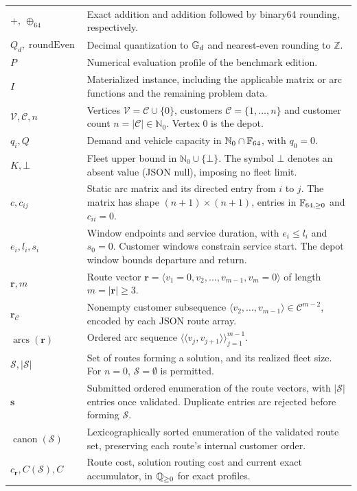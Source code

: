 \begin{longtable}{@{}>{\raggedright\arraybackslash}p{4cm}>{\raggedright\arraybackslash}p{12cm}@{}}
$+,\ \oplus_{64}$ & Exact addition and addition followed by binary64 rounding, respectively.\\
$Q_d,\operatorname{roundEven}$ & Decimal quantization to $\mathbb{G}_{d}$ and nearest-even rounding to $\mathbb{Z}$.\\
$P$ & Numerical evaluation profile of the benchmark edition.\\
$I$ & Materialized instance, including the applicable matrix or arc functions and the remaining problem data.\\
$\mathcal{V},\mathcal{C},n$ & Vertices $\mathcal{V}=\mathcal{C}\cup\{0\}$, customers $\mathcal{C}=\{1,\ldots,n\}$ and customer count $n=|\mathcal{C}|\in\mathbb{N}_0$. Vertex 0 is the depot.\\
$q_i,Q$ & Demand and vehicle capacity in $\mathbb{N}_0\cap\mathbb{F}_{64}$, with $q_0=0$.\\
$K,\bot$ & Fleet upper bound in $\mathbb{N}_0\cup\{\bot\}$. The symbol $\bot$ denotes an absent value (JSON null), imposing no fleet limit.\\
$c,c_{ij}$ & Static arc matrix and its directed entry from $i$ to $j$. The matrix has shape $(n+1)\times(n+1)$, entries in $\mathbb{F}_{64,\geq0}$ and $c_{ii}=0$.\\
$e_i,l_i,s_i$ & Window endpoints and service duration, with $e_i\leq l_i$ and $s_0=0$. Customer windows constrain service start. The depot window bounds departure and return.\\
$\mathbf{r},m$ & Route vector $\mathbf{r}=\langle v_1=0,v_2,\ldots,v_{m-1},v_m=0\rangle$ of length $m=|\mathbf{r}|\geq3$.\\
$\mathbf{r}_{\mathcal{C}}$ & Nonempty customer subsequence $\langle v_2,\ldots,v_{m-1}\rangle\in\mathcal{C}^{m-2}$, encoded by each JSON route array.\\
$\operatorname{arcs}(\mathbf{r})$ & Ordered arc sequence $\langle\langle v_j,v_{j+1}\rangle\rangle_{j=1}^{m-1}$.\\
$\mathcal{S},|\mathcal{S}|$ & Set of routes forming a solution, and its realized fleet size. For $n=0$, $\mathcal{S}=\emptyset$ is permitted.\\
$\mathbf{s}$ & Submitted ordered enumeration of the route vectors, with $|\mathcal{S}|$ entries once validated. Duplicate entries are rejected before forming $\mathcal{S}$.\\
$\operatorname{canon}(\mathcal{S})$ & Lexicographically sorted enumeration of the validated route set, preserving each route's internal customer order.\\
$c_{\mathbf{r}},C(\mathcal{S}),C$ & Route cost, solution routing cost and current exact accumulator, in $\mathbb{Q}_{\geq0}$ for exact profiles.\\

\end{longtable}
